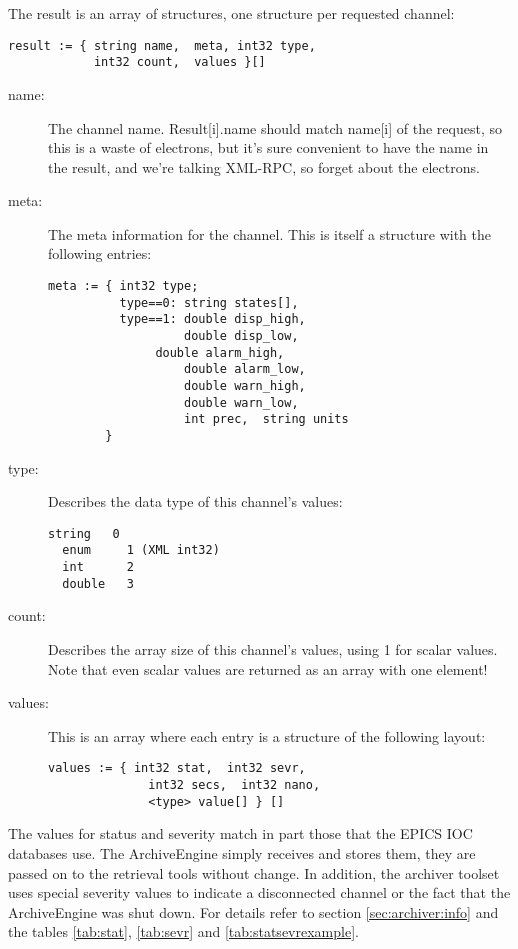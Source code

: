 \noindent The result is an array of structures,  one structure per
requested channel:

\begin{lstlisting}[keywordstyle=\sffamily]
result := { string name,  meta, int32 type,
            int32 count,  values }[]
\end{lstlisting}

\begin{description}
\item[\sffamily name:]
   The channel name.
   Result[i].name should match name[i] of the request, 
   so this is a waste of electrons,  but it's sure convenient
   to have the name in the result,  and we're talking XML-RPC,
   so forget about the electrons.
\item[\sffamily meta:]
   The meta information for the channel. This is itself a structure 
   with the following entries:
   \begin{lstlisting}[keywordstyle=\sffamily]
meta := { int32 type;
          type==0: string states[], 
          type==1: double disp_high, 
                   double disp_low, 
	           double alarm_high, 
                   double alarm_low, 
                   double warn_high, 
                   double warn_low, 
                   int prec,  string units
        }
   \end{lstlisting}
\item[\sffamily type:]
   Describes the data type of this channel's values:
  \begin{lstlisting}[frame=none, keywordstyle=\sffamily]
  string   0
  enum	   1 (XML int32)
  int      2
  double   3
  \end{lstlisting}
\item[\sffamily count:]
  Describes the array size of this channel's values,  using 1 for
  scalar values. Note that even scalar values are returned as an array
  with one element!
\item[\sffamily values:]
  This is an array where each entry is a structure of the following
  layout:
  \begin{lstlisting}[frame=none, keywordstyle=\sffamily]
  values := { int32 stat,  int32 sevr,
              int32 secs,  int32 nano,
              <type> value[] } []
  \end{lstlisting}
\end{description}

\noindent The values for status and severity match in part those that
the EPICS IOC databases use. The ArchiveEngine simply receives and
stores them, they are passed on to the retrieval tools without
change. In addition, the archiver toolset uses special severity values
to indicate a disconnected channel or the fact that the ArchiveEngine
was shut down.  For details refer to section \ref{sec:archiver:info}
and the tables \ref{tab:stat}, \ref{tab:sevr} and
\ref{tab:statsevrexample}.

